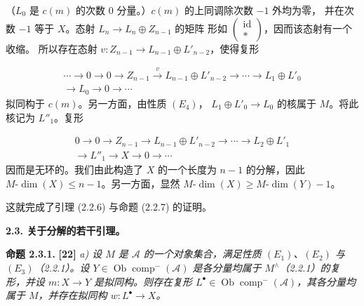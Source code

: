 \clearpage
{}%
\begingroup\small\setlength{\parskip}{0pt}\setlength{\emergencystretch}{1.5em}
\setlength{\abovedisplayskip}{4pt plus 2pt minus 2pt}%
\setlength{\belowdisplayskip}{4pt plus 2pt minus 2pt}%

（$L_0$ 是 $c(m)$ 的次数 $0$ 分量。）$c(m)$ 的上同调除次数 $-1$ 外均为零，
并在次数 $-1$ 等于 $X$。态射 $L_n\longrightarrow L_n\oplus Z_{n-1}$ 的矩阵
形如 $\begin{pmatrix}\operatorname{id}\\ *\end{pmatrix}$，因而该态射有一个收缩。
所以存在态射 $v\colon Z_{n-1}\longrightarrow L_{n-1}\oplus L'_{n-2}$，使得复形

\[
\begin{aligned}
\cdots\longrightarrow0\longrightarrow0\longrightarrow Z_{n-1}
\xrightarrow{v}L_{n-1}\oplus L'_{n-2}\longrightarrow\cdots
\longrightarrow L_1\oplus L'_0\\
\longrightarrow L_0\longrightarrow0\longrightarrow\cdots
\end{aligned}
\]
拟同构于 $c(m)$。另一方面，由性质 $(E_4)$，
$L_1\oplus L'_0\longrightarrow L_0$ 的核属于 $M$。将此核记为 $L''_1$。复形

\[
\begin{aligned}
0\longrightarrow0\longrightarrow Z_{n-1}
\longrightarrow L_{n-1}\oplus L'_{n-2}\longrightarrow\cdots
\longrightarrow L_2\oplus L'_1\\
\longrightarrow L''_1\longrightarrow X\longrightarrow0\longrightarrow\cdots
\end{aligned}
\]
因而是无环的。我们由此构造了 $X$ 的一个长度为 $n-1$ 的分解，因此
$M\text{-}\dim(X)\leq n-1$。另一方面，显然
$M\text{-}\dim(X)\geq M\text{-}\dim(Y)-1$。

这就完成了引理 (2.2.6) 与命题 (2.2.7) 的证明。

\medskip\noindent\textbf{2.3. 关于分解的若干引理。}

\medskip\noindent\textbf{命题 2.3.1.} \textbf{[22]}\quad
\textit{a) 设 $M$ 是 $\mathcal A$ 的一个对象集合，满足性质 $(E_1)$、$(E_2)$
与 $(E_3)$（2.2.1）。设
$Y\in\operatorname{Ob}\operatorname{comp}^{-}(\mathcal A)$ 是各分量均属于
$M^\wedge$（2.2.1）的复形，并设
$m\colon X\longrightarrow Y$ 是拟同构。则存在复形
$L^\bullet\in\operatorname{Ob}\operatorname{comp}^{-}(\mathcal A)$，其各分量均属于
$M$，并存在拟同构 $w\colon L^\bullet\longrightarrow X$。}


